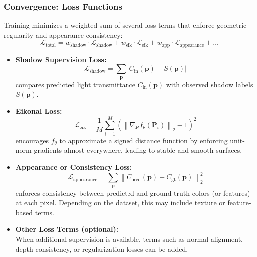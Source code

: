 \documentclass[12pt,a4paper]{article}
\theoremstyle{definition}
\begin{document}
\subsubsection{Convergence: Loss Functions} \label{sec:loss_functions}

Training minimizes a weighted sum of several loss terms that enforce geometric regularity and appearance consistency:
\begin{equation*}
\mathcal{L}_{\text{total}} = w_{\text{shadow}} \cdot \mathcal{L}_{\text{shadow}} + w_{\text{eik}} \cdot \mathcal{L}_{\text{eik}} + w_{\text{app}} \cdot \mathcal{L}_{\text{appearance}} + \ldots
\end{equation*}

\begin{itemize}
    \item \textbf{Shadow Supervision Loss:}
    \begin{equation*}
    \mathcal{L}_{\text{shadow}} = \sum_{\mathbf{p}} \left| C_{\mathrm{in}}(\mathbf{p}) - S(\mathbf{p}) \right|
    \end{equation*}
    compares predicted light transmittance $C_{\mathrm{in}}(\mathbf{p})$ with observed shadow labels $S(\mathbf{p})$.

    \item \textbf{Eikonal Loss:}
    \begin{equation*}
    \mathcal{L}_{\text{eik}} = \frac{1}{M} \sum_{i=1}^M \left( \left\| \nabla_\mathbf{P} f_\theta(\mathbf{P}_i) \right\|_2 - 1 \right)^2
    \end{equation*}
    encourages $f_\theta$ to approximate a signed distance function by enforcing unit-norm gradients almost everywhere, leading to stable and smooth surfaces.

    \item \textbf{Appearance or Consistency Loss:}
    \begin{equation*}
    \mathcal{L}_{\text{appearance}} = \sum_{\mathbf{p}} \left\| C_{\text{pred}}(\mathbf{p}) - C_{\text{gt}}(\mathbf{p}) \right\|_2^2
    \end{equation*}
    enforces consistency between predicted and ground-truth colors (or features) at each pixel. Depending on the dataset, this may include texture or feature-based terms.

    \item \textbf{Other Loss Terms (optional):} \\
    When additional supervision is available, terms such as normal alignment, depth consistency, or regularization losses can be added.
\end{itemize}
\end{document}
